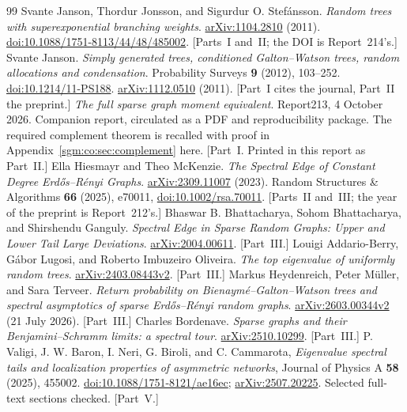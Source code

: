 \documentclass[11pt,letterpaper]{article}
\theoremstyle{remark}\newtheorem{remark}[theorem]{Remark}
\theoremstyle{definition}\newtheorem{definition}[theorem]{Definition}
\begin{document}
\begin{thebibliography}{99}
 Svante Janson, Thordur Jonsson, and Sigurdur O. Stef\'ansson.
\emph{Random trees with superexponential branching weights}.
\href{https://arxiv.org/abs/1104.2810}{arXiv:1104.2810} (2011).
\href{https://doi.org/10.1088/1751-8113/44/48/485002}{doi:10.1088/1751-8113/44/48/485002}. [Parts~I and~II; the DOI is Report~214's.]
 Svante Janson.
\emph{Simply generated trees, conditioned Galton--Watson trees, random allocations and condensation}.
Probability Surveys \textbf{9} (2012), 103--252.
\href{https://doi.org/10.1214/11-PS188}{doi:10.1214/11-PS188}.
\href{https://arxiv.org/abs/1112.0510}{arXiv:1112.0510} (2011). [Part~I cites the journal, Part~II the preprint.]
 \emph{The full sparse graph moment equivalent}.
Report213, 4 October 2026. Companion report, circulated as a PDF and reproducibility package.
The required complement theorem is recalled with proof in Appendix~\ref{sgm:co:sec:complement} here.
[Part~I. Printed in this report as Part~II.]
 Ella Hiesmayr and Theo McKenzie.
\emph{The Spectral Edge of Constant Degree Erd\H{o}s--R\'enyi Graphs}.
\href{https://arxiv.org/abs/2309.11007}{arXiv:2309.11007} (2023).
Random Structures \& Algorithms \textbf{66} (2025), e70011,
\href{https://doi.org/10.1002/rsa.70011}{doi:10.1002/rsa.70011}. [Parts~II and~III; the year of the preprint is Report~212's.]
 Bhaswar B. Bhattacharya, Sohom Bhattacharya, and Shirshendu Ganguly.
\emph{Spectral Edge in Sparse Random Graphs: Upper and Lower Tail Large Deviations}.
\href{https://arxiv.org/abs/2004.00611}{arXiv:2004.00611}. [Part~III.]
 Louigi Addario-Berry, G\'abor Lugosi, and Roberto Imbuzeiro Oliveira.
\emph{The top eigenvalue of uniformly random trees}.
\href{https://arxiv.org/abs/2403.08443v2}{arXiv:2403.08443v2}. [Part~III.]
 Markus Heydenreich, Peter M\"uller, and Sara Terveer.
\emph{Return probability on Bienaym\'e--Galton--Watson trees and spectral asymptotics of sparse Erd\H{o}s--R\'enyi random graphs}.
\href{https://arxiv.org/abs/2603.00344v2}{arXiv:2603.00344v2} (21 July 2026). [Part~III.]
 Charles Bordenave.
\emph{Sparse graphs and their Benjamini--Schramm limits: a spectral tour}.
\href{https://arxiv.org/abs/2510.10299}{arXiv:2510.10299}. [Part~III.]
 P. Valigi, J. W. Baron, I. Neri, G. Biroli, and C. Cammarota, \emph{Eigenvalue spectral tails and localization properties of asymmetric networks}, Journal of Physics A \textbf{58} (2025), 455002. \href{https://doi.org/10.1088/1751-8121/ae16ec}{doi:10.1088/1751-8121/ae16ec}; \href{https://arxiv.org/abs/2507.20225}{arXiv:2507.20225}. Selected full-text sections checked. [Part~V.]

\end{thebibliography}
\end{document}
